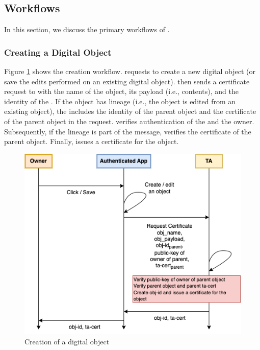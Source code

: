 \subsection{Workflows}
\label{sec:workflows}

In this section, we discuss the primary workflows of \name.

\subsubsection{Creating a Digital Object}
\label{sec:new-object}

Figure \ref{fig:creation} shows the creation workflow. \Owner requests \authapp to create a new digital object (or save the edits performed on an existing digital object). \App then sends a certificate request to \ta with the name of the object, its payload (i.e., contents), and the identity of the \owner. If the object has lineage (i.e., the object is edited from an existing object), the \app includes the identity of the parent object and the certificate of the parent object in the request. \ta verifies authentication of the \app and the owner. Subsequently, if the lineage is part of the message, \ta verifies the certificate of the parent object. Finally, \ta issues a certificate for the object. 

\begin{figure}[htpb]
  \centering
  \includegraphics[scale=0.45]{creation.png}
  \caption{Creation of a digital object}
  \label{fig:creation}
\end{figure}

